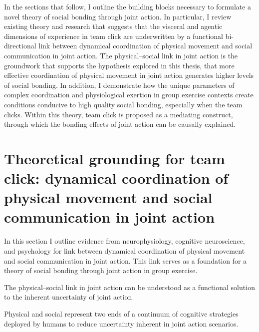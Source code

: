 \begin{CJK}{UTF8}{gbsn}
In the sections that follow, I outline the building blocks necessary to formulate a novel theory of social bonding through joint action.  In particular, I review existing theory and research that suggests that the visceral and agentic dimensions of experience in team click are underwritten by a functional bi-directional link between dynamical coordination of physical movement and social communication in joint action.  The physical--social link in joint action is the groundwork that supports the hypothesis explored in this thesis, that more effective coordination of physical movement in joint action generates higher levels of social bonding.  In addition, I demonstrate how the unique parameters of complex coordination and physiological exertion in group exercise contexts create conditions conducive to high quality social bonding, especially when the team clicks.  Within this theory, team click is proposed as a mediating construct, through which the bonding effects of joint action can be causally explained.






\section{Theoretical grounding for team click: dynamical coordination of physical movement and social communication in joint action}



In this section I outline evidence from neurophysiology, cognitive neuroscience, and psychology for link between dynamical coordination of physical movement and social communication in joint action.  This link serves as a foundation for a theory of social bonding through joint action in group exercise.


The physical--social link in joint action can be understood as a functional solution to the inherent uncertainty of joint action

Physical and social represent two ends of a continuum of cognitive strategies deployed by humans to reduce uncertainty inherent in joint action scenarios.


\end{CJK}
